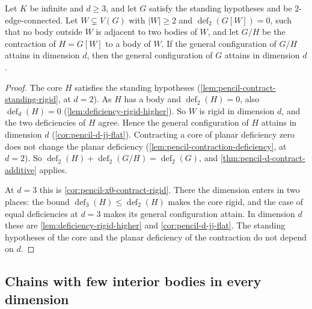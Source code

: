 \begin{corollary}
  \label{cor:pencil-d-contract-rigid}
  \leanok
  Let $K$ be infinite and $d \ge 3$, and let $G$ satisfy the standing
  hypotheses and be $2$-edge-connected. Let $W \subsetneq V(G)$ with
  $|W| \ge 2$ and $\operatorname{def}_2(G[W]) = 0$, such that no body
  outside $W$ is adjacent to two bodies of $W$, and let $G/H$ be the
  contraction of $H = G[W]$ to a body of $W$. If the general
  configuration of $G/H$ attains in dimension $d$, then the general
  configuration of $G$ attains in dimension $d$.
\end{corollary}
\begin{proof}
  \leanok
  The core $H$ satisfies the standing hypotheses
  (\cref{lem:pencil-contract-standing-rigid}, at $d = 2$). As $H$ has a
  body and $\operatorname{def}_2(H) = 0$, also
  $\operatorname{def}_d(H) = 0$ (\cref{lem:deficiency-rigid-higher}). So
  $W$ is rigid in dimension $d$, and the two deficiencies of $H$ agree.
  Hence the general configuration of $H$ attains in dimension $d$
  (\cref{cor:pencil-d-jj-flat}). Contracting a core of planar deficiency
  zero does not change the planar deficiency
  (\cref{lem:pencil-contraction-deficiency}, at $d = 2$). So
  $\operatorname{def}_2(H) + \operatorname{def}_2(G/H) =
  \operatorname{def}_2(G)$, and \cref{thm:pencil-d-contract-additive}
  applies.

  At $d = 3$ this is \cref{cor:pencil-x0-contract-rigid}. There the
  dimension enters in two places: the bound
  $\operatorname{def}_3(H) \le \operatorname{def}_2(H)$ makes the core
  rigid, and the case of equal deficiencies at $d = 3$ makes its general
  configuration attain. In dimension $d$ these are
  \cref{lem:deficiency-rigid-higher} and \cref{cor:pencil-d-jj-flat}. The
  standing hypotheses of the core and the planar deficiency of the
  contraction do not depend on $d$.
\end{proof}

\subsection{Chains with few interior bodies in every dimension}
\label{sec:pencil-d-chains}

